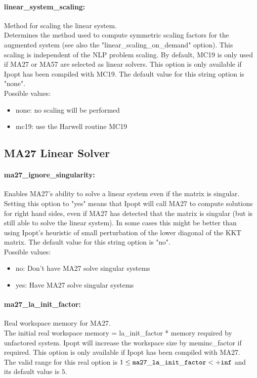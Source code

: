 \paragraph{linear\_system\_scaling:}\label{sec:linear_system_scaling} Method for scaling the linear system. $\;$ \\
 Determines the method used to compute symmetric
scaling factors for the augmented system (see
also the "linear\_scaling\_on\_demand" option). 
This scaling is independent of the NLP problem
scaling.  By default, MC19 is only used if MA27
or MA57 are selected as linear solvers. This
option is only available if Ipopt has been
compiled with MC19.
The default value for this string option is "none".
\\ 
Possible values:
\begin{itemize}
   \item none: no scaling will be performed
   \item mc19: use the Harwell routine MC19
\end{itemize}

\subsection{MA27 Linear Solver}
\label{sec:MA27_Linear_Solver}
\paragraph{ma27\_ignore\_singularity:}\label{sec:ma27_ignore_singularity} Enables MA27's ability to solve a linear system even if the matrix is singular. $\;$ \\
 Setting this option to "yes" means that Ipopt
will call MA27 to compute solutions for right
hand sides, even if MA27 has detected that the
matrix is singular (but is still able to solve
the linear system). In some cases this might be
better than using Ipopt's heuristic of small
perturbation of the lower diagonal of the KKT
matrix.
The default value for this string option is "no".
\\ 
Possible values:
\begin{itemize}
   \item no: Don't have MA27 solve singular systems
   \item yes: Have MA27 solve singular systems
\end{itemize}

\paragraph{ma27\_la\_init\_factor:}\label{sec:ma27_la_init_factor} Real workspace memory for MA27. $\;$ \\
 The initial real workspace memory =
la\_init\_factor * memory required by unfactored
system. Ipopt will increase the workspace size by
meminc\_factor if required.  This option is only
available if  Ipopt has been compiled with MA27. The valid range for this real option is 
$1 \le {\tt ma27\_la\_init\_factor } <  {\tt +inf}$
and its default value is $5$.


